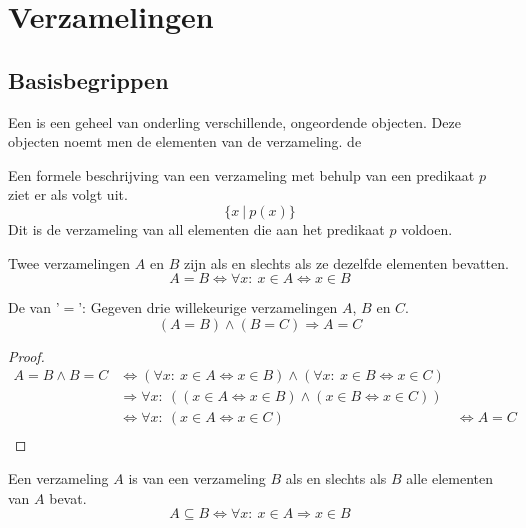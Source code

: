 \documentclass[main.tex]{subfiles}
\begin{document}
\chapter{Verzamelingen}
\label{cha:verzamelingen}

\section{Basisbegrippen}
\label{sec:basisbegrippen}

\begin{de}
  Een  is een geheel van onderling verschillende, ongeordende objecten. Deze objecten noemt men de elementen van de verzameling.
de 
\end{de}

\begin{de}
  Een formele beschrijving van een verzameling met behulp van een predikaat $p$ ziet er als volgt uit.
  \[ \{x\ |\ p(x)\} \]
  Dit is de verzameling van all elementen die aan het predikaat $p$ voldoen.
\end{de}

\begin{de}
  Twee verzamelingen $A$ en $B$ zijn  als en slechts als ze dezelfde elementen bevatten. 
  \[ A = B \Leftrightarrow \forall x:\ x \in A \Leftrightarrow x \in B \]
\end{de}

\begin{st}
  De  van '$=$': Gegeven drie willekeurige verzamelingen $A$, $B$ en $C$.
  \[ (A = B) \wedge (B = C) \Rightarrow A = C \]
  \begin{proof}
    \[
    \begin{array}{cll}
      A = B \wedge B = C &\Leftrightarrow (\forall x:\ x \in A \Leftrightarrow x \in B) \wedge (\forall x:\ x \in B \Leftrightarrow x \in C) &\\
      &\Rightarrow \forall x:\ ((x \in A \Leftrightarrow x \in B) \wedge (x \in B \Leftrightarrow x \in C)) &\\
      &\Leftrightarrow \forall x:\ (x \in A \Leftrightarrow x \in C) &\Leftrightarrow  A = C\\
    \end{array}
    \]
  \end{proof}
\end{st}

\begin{de}
  Een verzameling $A$ is  van een verzameling $B$ als en slechts als $B$ alle elementen van $A$ bevat.
  \[ A \subseteq B \Leftrightarrow \forall x:\ x \in A \Rightarrow x \in B\]
\end{de}
\end{document}
